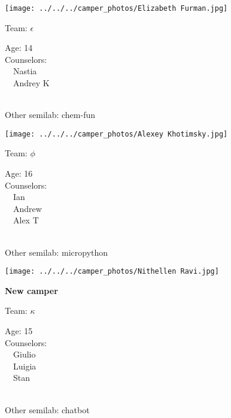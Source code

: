\documentclass[10pt,letterpaper, landscape]{article}
\begin{document}
\horizontalshiftfornextsticker
\renewcommand{\baselinestretch}{1} \begin{sticker}
\noindent\begin{minipage}{0.5\textwidth}\texttt{[image: ../../../camper\_photos/Elizabeth Furman.jpg]}\end{minipage}\begin{minipage}{0.45\textwidth}
Team: {\Large $\epsilon$}

Age:        14\\
Counselors: \\\ \ Nastia\\\ \ Andrey K\\
\end{minipage} \\ \vspace{0.07in}
Other semilab: chem-fun
\end{sticker}
\horizontalshiftfornextsticker
\renewcommand{\baselinestretch}{1} \begin{sticker}
\noindent\begin{minipage}{0.5\textwidth}\texttt{[image: ../../../camper\_photos/Alexey Khotimsky.jpg]}\end{minipage}\begin{minipage}{0.45\textwidth}
Team: {\Large $\phi$}

Age:        16\\
Counselors: \\\ \ Ian\\\ \ Andrew\\\ \ Alex T\\
\end{minipage} \\ \vspace{0.07in}
Other semilab: micropython
\end{sticker}
\verticalshiftfornextsticker
\renewcommand{\baselinestretch}{1} \begin{sticker}
\noindent\begin{minipage}{0.5\textwidth}\texttt{[image: ../../../camper\_photos/Nithellen Ravi.jpg]}\end{minipage}\begin{minipage}{0.45\textwidth}
\textbf{New camper} 

Team: {\Large $\kappa$}

Age:        15\\
Counselors: \\\ \ Giulio\\\ \ Luigia\\\ \ Stan\\
\end{minipage} \\ \vspace{0.07in}
Other semilab: chatbot
\end{sticker}
\end{document}
